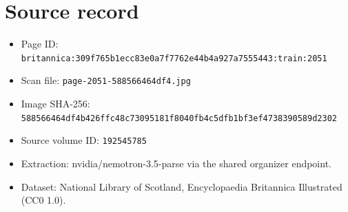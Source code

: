 \documentclass{article}
\begin{document}
\section*{Source record}
\begin{itemize}
\item Page ID: \texttt{britannica:309f765b1ecc83e0a7f7762e44b4a927a7555443:train:2051}
\item Scan file: \texttt{page-2051-588566464df4.jpg}
\item Image SHA-256: \texttt{588566464df4b426ffc48c73095181f8040fb4c5dfb1bf3ef4738390589d2302}
\item Source volume ID: \texttt{192545785}
\item Extraction: nvidia/nemotron-3.5-parse via the shared organizer endpoint.
\item Dataset: National Library of Scotland, Encyclopaedia Britannica Illustrated (CC0 1.0).
\end{itemize}
\end{document}
